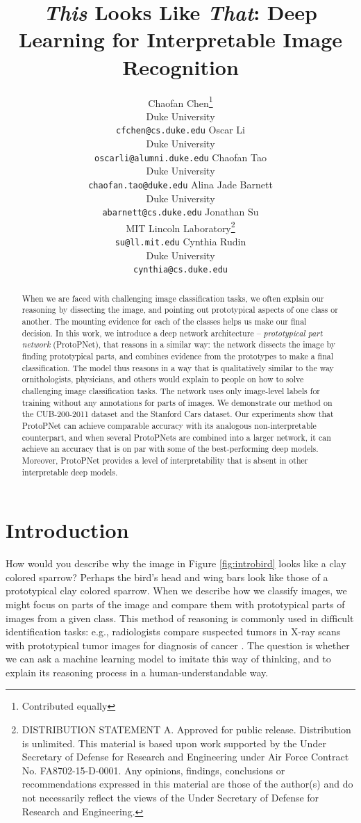 \documentclass{article}
\title{\textit{This} Looks Like \textit{That}: Deep Learning for Interpretable Image Recognition}
\author{%
  Chaofan Chen\thanks{\protect Contributed equally}\\
  Duke University\\
  \small{\texttt{cfchen@cs.duke.edu}}
  \And
  Oscar Li\footnotemark[1]\\
  Duke University\\
  \small{\texttt{oscarli@alumni.duke.edu}}
  \And
  Chaofan Tao\\
  Duke University\\
  \small{\texttt{chaofan.tao@duke.edu}}
  \And
  Alina Jade Barnett\\
  Duke University\\
  \small{\texttt{abarnett@cs.duke.edu}}
  \And
  Jonathan Su\\
  MIT Lincoln Laboratory\thanks{\protect DISTRIBUTION STATEMENT A. Approved for public release. Distribution is unlimited. This material is based upon work supported by the Under Secretary of Defense for Research and Engineering under Air Force Contract No. FA8702-15-D-0001. Any opinions, findings, conclusions or recommendations expressed in this material are those of the author(s) and do not necessarily reflect the views of the Under Secretary of Defense for Research and Engineering.}\\
  \small{\texttt{su@ll.mit.edu}}
  \And
  Cynthia Rudin\\
  Duke University\\
  \small{\texttt{cynthia@cs.duke.edu}}
}
\theoremstyle{definition}
\theoremstyle{remark}
\begin{document}
\maketitle

\begin{abstract}
  When we are faced with challenging image classification tasks, we often explain our reasoning by dissecting the image, and pointing out prototypical aspects of one class or another. The mounting evidence for each of the classes helps us make our final decision. In this work, we introduce a deep network architecture -- \textit{prototypical part network} (ProtoPNet), that reasons in a similar way: the network dissects the image by finding prototypical parts, and combines evidence from the prototypes to make a final classification. The model thus reasons in a way that is qualitatively similar to the way ornithologists, physicians, and others would explain to people on how to solve challenging image classification tasks. The network uses only image-level labels for training without any annotations for parts of images. We demonstrate our method on the CUB-200-2011 dataset and the Stanford Cars dataset. Our experiments show that ProtoPNet can achieve comparable accuracy with its analogous non-interpretable counterpart, and when several ProtoPNets are combined into a larger network, it can achieve an accuracy that is on par with some of the best-performing deep models. Moreover, ProtoPNet provides a level of interpretability that is absent in other interpretable deep models.
\end{abstract}

\section{Introduction}
%
How would you describe why the image in Figure \ref{fig:introbird} looks like a clay colored sparrow? Perhaps the bird's head and wing bars look like those of a prototypical clay colored sparrow.
When we describe how we classify images, we might focus on parts of the image and compare them with prototypical parts of images from a given class. This method of reasoning is commonly used in difficult identification tasks: e.g., radiologists compare suspected tumors in X-ray scans with prototypical tumor images for diagnosis of cancer \cite{HoltEtAl2005}. The question is whether we can ask a machine learning model to imitate this way of thinking, and to explain its reasoning process in a human-understandable way.
\end{document}
